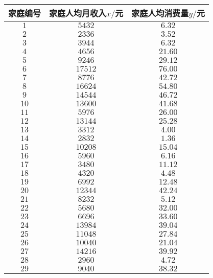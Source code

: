 \begin{center}
    \begin{longtable}{|c|c|c|}
        \hline
        家庭编号 & 家庭人均月收入$x/$元 & 家庭人均消费量$y/$元\\ \hline
        \endhead 
        $1$ & $5432$ & $6.32$\\ \hline 
        $2$ & $2336$ & $3.52$\\ \hline 
        $3$ & $3944$ & $6.32$\\ \hline 
        $4$ & $4656$ & $21.60$\\ \hline 
        $5$ & $9246$ & $29.12$\\ \hline 
        $6$ & $17512$ & $76.00$\\ \hline 
        $7$ & $8776$ & $42.72$\\ \hline 
        $8$ & $16624$ & $54.80$\\ \hline 
        $9$ & $14544$ & $46.72$\\ \hline 
        $10$ & $13600$ & $41.68$\\ \hline 
        $11$ & $5976$ & $26.00$\\ \hline 
        $12$ & $13144$ & $25.28$\\ \hline 
        $13$ & $3312$ & $4.00$\\ \hline 
        $14$ & $2832$ & $1.36$\\ \hline 
        $15$ & $10208$ & $15.04$\\ \hline 
        $16$ & $5960$ & $6.16$\\ \hline 
        $17$ & $3480$ & $11.12$\\ \hline 
        $18$ & $4320$ & $4.48$\\ \hline 
        $19$ & $6992$ & $12.48$\\ \hline 
        $20$ & $12344$ & $42.24$\\ \hline 
        $21$ & $8232$ & $5.12$\\ \hline 
        $22$ & $5680$ & $32.00$\\ \hline 
        $23$ & $6696$ & $33.60$\\ \hline 
        $24$ & $13984$ & $39.04$\\ \hline 
        $25$ & $11048$ & $27.84$\\ \hline 
        $26$ & $10040$ & $21.04$\\ \hline 
        $27$ & $14216$ & $39.92$\\ \hline 
        $28$ & $2960$ & $4.72$\\ \hline 
        $29$ & $9040$ & $38.32$\\ \hline 

\end{longtable}
\end{center}
